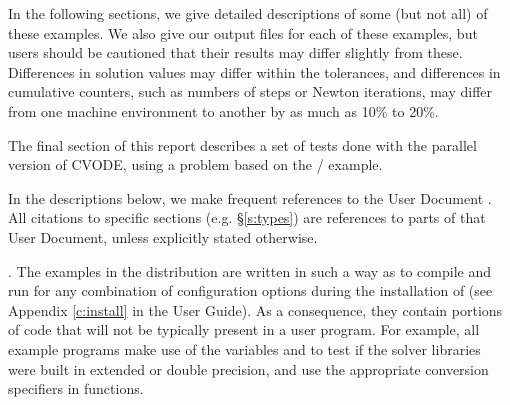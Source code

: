 \vspace{0.2in}\noindent
In the following sections, we give detailed descriptions of some (but
not all) of these examples.  We also give our output files for
each of these examples, but users should be cautioned that their
results may differ slightly from these.  Differences in solution
values may differ within the tolerances, and differences in cumulative
counters, such as numbers of steps or Newton iterations, may differ
from one machine environment to another by as much as 10\% to 20\%.

The final section of this report describes a set of tests done with the
parallel version of CVODE, using a problem based on the
/ example.

In the descriptions below, we make frequent references to the {\cvode}
User Document \cite{cvode_ug}.  All citations to specific sections
(e.g. \S\ref{s:types}) are references to parts of that User Document, unless
explicitly stated otherwise.

\vspace{0.2in}.
The examples in the {\cvode} distribution are written in such a way as
to compile and run for any combination of configuration options during
the installation of {\sundials} (see Appendix \ref{c:install} in the User Guide).
As a consequence, they contain portions of code that will not be typically present in a
user program. For example, all {\CC} example programs make use of the
variables  and 
to test if the solver libraries were built in extended or double precision,
and use the appropriate conversion specifiers in  functions.
